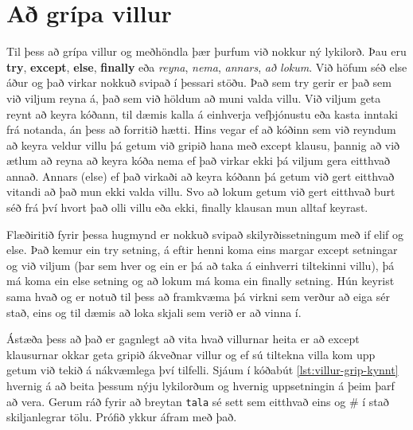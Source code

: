 \section{Að grípa villur}\label{uk:villur-grípa}
Til þess að grípa villur og meðhöndla þær þurfum við nokkur ný lykilorð.
Þau eru \textbf{try}, \textbf{except}, \textbf{else}, \textbf{finally} eða \textit{reyna}, \textit{nema}, \textit{annars}, \textit{að lokum}.
Við höfum séð else áður og það virkar nokkuð svipað í þessari stöðu.
Það sem try gerir er það sem við viljum reyna á, það sem við höldum að muni valda villu.
Við viljum geta reynt að keyra kóðann, til dæmis kalla á einhverja vefþjónustu eða kasta inntaki frá notanda, án þess að forritið hætti.
Hins vegar ef að kóðinn sem við reyndum að keyra veldur villu þá getum við gripið hana með except klausu, þannig að við ætlum að reyna að keyra kóða nema ef það virkar ekki þá viljum gera eitthvað annað.
Annars (else) ef það virkaði að keyra kóðann þá getum við gert eitthvað vitandi að það mun ekki valda villu.
Svo að lokum getum við gert eitthvað burt séð frá því hvort það olli villu eða ekki, finally klausan mun alltaf keyrast.

Flæðiritið fyrir þessa hugmynd er nokkuð svipað skilyrðissetningum með if elif og else.
Það kemur ein try setning, á eftir henni koma eins margar except setningar og við viljum (þar sem hver og ein er þá að taka á einhverri tiltekinni villu), þá má koma ein else setning og að lokum má koma ein finally setning.
Hún keyrist sama hvað og er notuð til þess að framkvæma þá virkni sem verður að eiga sér stað, eins og til dæmis að loka skjali sem verið er að vinna í.

Ástæða þess að það er gagnlegt að vita hvað villurnar heita er að except klausurnar okkar geta gripið ákveðnar villur og ef sú tiltekna villa kom upp getum við tekið á nákvæmlega því tilfelli.
Sjáum í kóðabút \ref{lst:villur-grip-kynnt} hvernig á að beita þessum nýju lykilorðum og hvernig uppsetningin á þeim þarf að vera.
Gerum ráð fyrir að breytan \texttt{tala} sé sett sem eitthvað eins og \# í stað skiljanlegrar tölu.
Prófið ykkur áfram með það.

